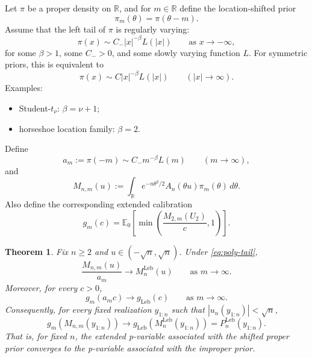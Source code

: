 \documentclass{article}%
\newtheorem{theorem}{Theorem}
\newcommand{\E}{\mathbb{E}}
\begin{document}
Let $\pi$ be a proper density on $\mathbb R$, and for $m\in\mathbb R$ define the location-shifted prior
\[
\pi_m(\theta)=\pi(\theta-m).
\]
Assume that the left tail of $\pi$ is regularly varying:
\begin{equation}\label{eq:poly-tail}
\pi(x)\sim C_-|x|^{-\beta}L(|x|)\qquad \text{as }x\to-\infty,
\end{equation}
for some $\beta>1$, some $C_->0$, and some slowly varying function $L$.
For symmetric priors, this is equivalent to
\[
\pi(x)\sim C|x|^{-\beta}L(|x|)\qquad (|x|\to\infty).
\]
Examples:
\begin{itemize}
\item Student-$t_\nu$: $\beta=\nu+1$;
\item horseshoe location family: $\beta=2$.
\end{itemize}

Define
\[
a_m:=\pi(-m)\sim C_-m^{-\beta}L(m)\qquad (m\to\infty),
\]
and
\begin{equation}\label{eq:Mn-m}
M_{n,m}(u)
:=
\int_{\mathbb R} e^{-n\theta^2/2}A_n(\theta u)\pi_m(\theta)\,d\theta.
\end{equation}
Also define the corresponding extended calibration
\[
g_m(c)
=
\E_0\!\left[\min\!\left(\frac{M_{2,m}(U_2)}{c},1\right)\right].
\]

\begin{theorem}\label{thm:recover-improper}
Fix $n\ge 2$ and $u\in(-\sqrt n,\sqrt n)$. Under \eqref{eq:poly-tail},
\begin{equation}\label{eq:Mn-asymp}
\frac{M_{n,m}(u)}{a_m}\longrightarrow M_n^{\mathrm{Leb}}(u)
\qquad\text{as }m\to\infty.
\end{equation}
Moreover, for every $c>0$,
\begin{equation}\label{eq:g-asymp}
g_m(a_m c)\longrightarrow g_{\mathrm{Leb}}(c)
\qquad\text{as }m\to\infty.
\end{equation}
Consequently, for every fixed realization $y_{1:n}$ such that $|u_n(y_{1:n})|<\sqrt n$,
\begin{equation}\label{eq:p-asymp}
g_m\!\left(M_{n,m}(y_{1:n})\right)
\longrightarrow
g_{\mathrm{Leb}}\!\left(M_n^{\mathrm{Leb}}(y_{1:n})\right)
=
P_n^{\mathrm{Leb}}(y_{1:n}).
\end{equation}
That is, for fixed $n$, the extended p-variable associated with the shifted proper prior converges to the p-variable associated with the improper prior.
\end{theorem}
\end{document}
